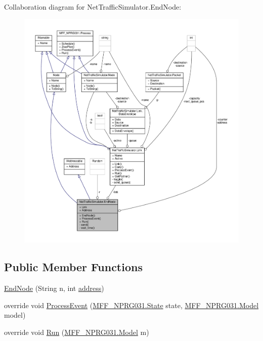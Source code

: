 Collaboration diagram for Net\-Traffic\-Simulator.\-End\-Node\-:\nopagebreak
\begin{figure}[H]
\begin{center}
\leavevmode
\includegraphics[width=350pt]{classNetTrafficSimulator_1_1EndNode__coll__graph}
\end{center}
\end{figure}
\subsection*{Public Member Functions}
\begin{DoxyCompactItemize}
\item 
\hyperlink{classNetTrafficSimulator_1_1EndNode_ab690976d2c39fafef1f5e5ad0a708ee8}{End\-Node} (String n, int \hyperlink{classNetTrafficSimulator_1_1EndNode_a84d0df6c9c755c895dffff6a531823d2}{address})
\item 
override void \hyperlink{classNetTrafficSimulator_1_1EndNode_a54624ab4b68ccc8c938905ac3e906623}{Process\-Event} (\hyperlink{classMFF__NPRG031_1_1State}{M\-F\-F\-\_\-\-N\-P\-R\-G031.\-State} state, \hyperlink{classMFF__NPRG031_1_1Model}{M\-F\-F\-\_\-\-N\-P\-R\-G031.\-Model} model)
\item 
override void \hyperlink{classNetTrafficSimulator_1_1EndNode_ad672744610489948d0a8126a84a1aab6}{Run} (\hyperlink{classMFF__NPRG031_1_1Model}{M\-F\-F\-\_\-\-N\-P\-R\-G031.\-Model} m)
\end{DoxyCompactItemize}
